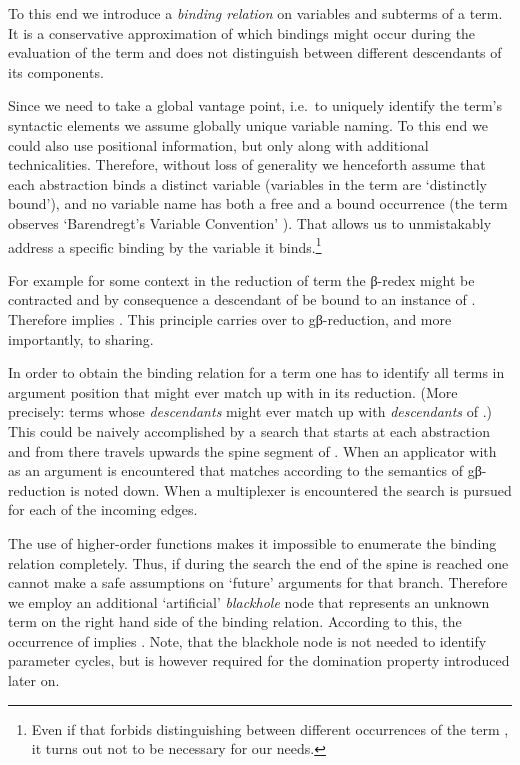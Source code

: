 \documentclass[submission,copyright,creativecommons]{eptcs}
\renewcommand\;{\,}
\begin{document}
To this end we introduce a \textit{binding relation}  on variables  and subterms  of a term. It is a conservative approximation
of which bindings might occur during the evaluation of the term and does not
distinguish between different descendants of its components.

Since we need to take a global vantage point, i.e.\ to uniquely identify the
term's syntactic elements we assume globally unique variable naming. To this
end we could also use positional information, but only along with additional
technicalities. Therefore, without loss of generality we henceforth assume that
each abstraction binds a distinct variable (variables in the term are `distinctly bound'), 
and no variable name has both a free and a bound occurrence (the term observes `Barendregt's Variable Convention' \cite[2.1.13, p.26]{bare:1984}). 
That allows us to unmistakably address a specific
binding  by the variable  it binds.\footnote{Even if that forbids
distinguishing between different occurrences of the term , it turns out not
to be necessary for our needs.}

For example for some context  in the reduction of term 
the β-redex  might be contracted and by consequence a
descendant of  be bound to an instance of . Therefore  implies . This principle carries over to gβ-reduction, and more importantly,
to sharing.

In order to obtain the binding relation for a term  one has to identify all
terms in argument position that might ever match up with  in its reduction.
(More precisely: terms whose {\it descendants} might ever match up with {\it
descendants} of .) This could be naively accomplished by a search that
starts at each abstraction  and from there travels upwards the spine
segment of . When an applicator with  as an argument is encountered that
matches  according to the semantics of gβ-reduction  is noted
down. When a multiplexer is encountered the search is pursued for each of the
incoming edges.

The use of higher-order functions makes it impossible to enumerate the binding
relation completely. Thus, if during the search
the end of the spine is reached one cannot make a safe assumptions on
`future' arguments for that branch. Therefore we employ an additional
`artificial' {\it blackhole} node  that represents an unknown term
on the right hand side of the binding relation. According to this, the
occurrence of  implies . Note, that the
blackhole node is not needed to identify parameter cycles, but is however
required for the domination property introduced later on.
\end{document}
